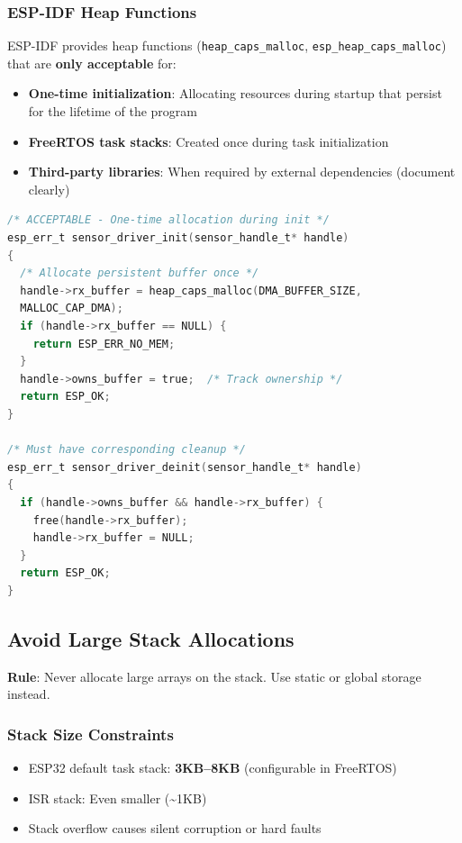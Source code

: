\subsubsection{ESP-IDF Heap Functions}

ESP-IDF provides heap functions (\texttt{heap\_caps\_malloc}, \texttt{esp\_heap\_caps\_malloc}) that are \textbf{only acceptable} for:

\begin{itemize}
\item \textbf{One-time initialization}: Allocating resources during startup that persist for the lifetime of the program
\item \textbf{FreeRTOS task stacks}: Created once during task initialization
\item \textbf{Third-party libraries}: When required by external dependencies (document clearly)
\end{itemize}

\begin{lstlisting}[language=C]
/* ACCEPTABLE - One-time allocation during init */
esp_err_t sensor_driver_init(sensor_handle_t* handle)
{
  /* Allocate persistent buffer once */
  handle->rx_buffer = heap_caps_malloc(DMA_BUFFER_SIZE,
  MALLOC_CAP_DMA);
  if (handle->rx_buffer == NULL) {
    return ESP_ERR_NO_MEM;
  }
  handle->owns_buffer = true;  /* Track ownership */
  return ESP_OK;
}

/* Must have corresponding cleanup */
esp_err_t sensor_driver_deinit(sensor_handle_t* handle)
{
  if (handle->owns_buffer && handle->rx_buffer) {
    free(handle->rx_buffer);
    handle->rx_buffer = NULL;
  }
  return ESP_OK;
}


\end{lstlisting}
\subsection{Avoid Large Stack Allocations}

\textbf{Rule}: Never allocate large arrays on the stack. Use static or global storage instead.

\subsubsection{Stack Size Constraints}

\begin{itemize}
\item ESP32 default task stack: \textbf{3KB--8KB} (configurable in FreeRTOS)
\item ISR stack: Even smaller (\textasciitilde1KB)
\item Stack overflow causes silent corruption or hard faults
\end{itemize}

